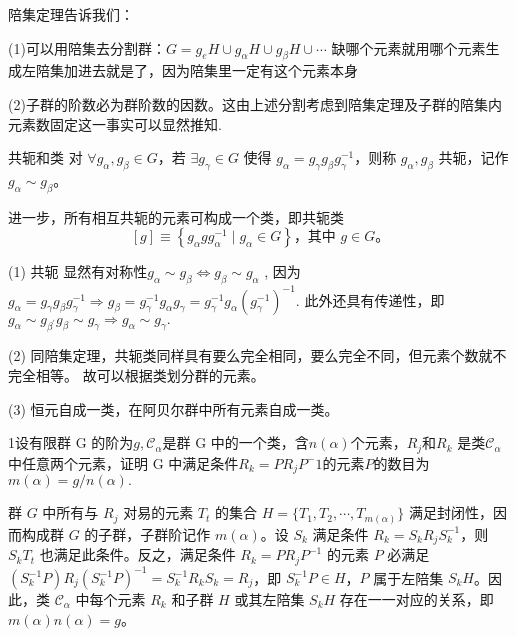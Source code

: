 \documentclass[12pt, openany]{ctexbook} %
\numberwithin{equation}{section} %
\begin{document}
陪集定理告诉我们：

(1)可以用陪集去分割群：$G=g_eH\cup g_\alpha H\cup g_\beta H\cup\cdots$
缺哪个元素就用哪个元素生成左陪集加进去就是了，因为陪集里一定有这个元素本身

(2)子群的阶数必为群阶数的因数。这由上述分割考虑到陪集定理及子群的陪集内元素数固定这一事实可以显然推知.

\begin{mydef}{共轭和类}
  对 $\forall g_\alpha, g_\beta \in G$，若 $\exists g_\gamma \in G$ 使得 $g_\alpha = g_\gamma g_\beta g_\gamma^{-1}$，则称 $g_\alpha, g_\beta$ 共轭，记作 $g_\alpha \sim g_\beta$。
   
  进一步，所有相互共轭的元素可构成一个类，即共轭类 
  \[
    [g] \equiv \left\{ g_\alpha g g_\alpha^{-1} \mid g_\alpha \in G \right\} \text{，其中 } g \in G。
  \]
\end{mydef}

(1) 共轭 显然有对称性$g_\alpha\sim g_\beta\Leftrightarrow g_\beta\sim g_\alpha$ ,
因为$g_\alpha=g_\gamma g_\beta g_\gamma^{-1}\Rightarrow g_\beta=g_\gamma^{-1}g_\alpha g_\gamma=g_\gamma^{-1}g_\alpha\left(g_\gamma^{-1}\right)^{-1}.$
此外还具有传递性，即$g_\alpha\sim g_{\beta^{\prime}}g_\beta\sim g_\gamma\Rightarrow g_\alpha\sim g_\gamma.$

(2) 同陪集定理，共轭类同样具有要么完全相同，要么完全不同，但元素个数就不完全相等。
故可以根据类划分群的元素。


(3) 恒元自成一类，在阿贝尔群中所有元素自成一类。
\begin{mytheo}{}
  1设有限群 G 的阶为$g,\mathcal{C}_\alpha$是群 G 中的一个类，含$n(\alpha)$个元素，$R_j$和$R_k$ 是类$\mathcal{C}_\alpha$中任意两个元素，证明 G 中满足条件$R_k=PR_jP^-1$的元素$P$的数目为$m(\alpha)=g/n(\alpha).$
\end{mytheo}

\begin{mypro}
  群 \( G \) 中所有与 \( R_j \) 对易的元素 \( T_t \) 的集合 \( H = \{T_1, T_2, \cdots, T_{m(\alpha)}\} \) 满足封闭性，因而构成群 \( G \) 的子群，子群阶记作 \( m(\alpha) \)。设 \( S_k \) 满足条件 \( R_k = S_k R_j S_k^{-1} \)，则 \( S_k T_t \) 也满足此条件。反之，满足条件 \( R_k = P R_j P^{-1} \) 的元素 \( P \) 必满足 \( (S_k^{-1} P) R_j (S_k^{-1} P)^{-1} = S_k^{-1} R_k S_k = R_j \)，即 \( S_k^{-1} P \in H \)，\( P \) 属于左陪集 \( S_k H \)。因此，类 \( \mathcal{C}_\alpha \) 中每个元素 \( R_k \) 和子群 \( H \) 或其左陪集 \( S_k H \) 存在一一对应的关系，即 \( m(\alpha) n(\alpha) = g \)。
\end{mypro}
\end{document}
